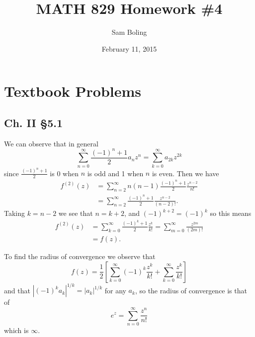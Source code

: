 \documentclass{article}
\title{MATH 829 Homework \#4}
\date{February 11, 2015}
\author{Sam Boling}
\newcounter{Problem}
\begin{document}
\begin{titlepage}
\maketitle
\end{titlepage}

\section{Textbook Problems}

\subsection*{Ch. II \S 5.1}
We can observe that in general
$$
  \sum_{n=0}^\infty \frac{(-1)^n + 1}{2} a_n z^n
= \sum_{k=0}^\infty a_{2k} z^{2k}
$$
since $\frac{(-1)^n + 1}{2}$ is 0 when $n$ is odd and 1 when $n$ is
even. Then we have
\begin{align*}
   f^{(2)}(z)
&= \sum_{n=2}^{\infty} n (n - 1) \frac{(-1)^n + 1}{2} \frac{z^{n-2}}{n!}  \\
&= \sum_{n=2}^{\infty} \frac{(-1)^n + 1}{2} \frac{z^{n-2}}{(n-2)!}.
\end{align*}
Taking $k = n - 2$ we see that $n = k + 2$, and $(-1)^{k + 2} =
(-1)^k$ so this means
\begin{align*}
   f^{(2)}(z)
&= \sum_{k=0}^\infty \frac{(-1)^k + 1}{2} \frac{z^k}{k!}
 = \sum_{m=0}^{\infty} \frac{z^{2m}}{(2m)!} \\
&= f(z).
\end{align*}

To find the radius of convergence we observe that
$$
  f(z)
= \frac{1}{2}\left[
    \sum_{k=0}^\infty (-1)^k \frac{z^k}{k!}
  + \sum_{k=0}^\infty \frac{z^k}{k!}
  \right]
$$
and that $|(-1)^k a_k|^{1 / k} = |a_k|^{1 / k}$ for any $a_k$,
so the radius of convergence is that of
$$
e^z = \sum_{n=0}^\infty \frac{z^n}{n!}
$$
which is $\infty$.
\end{document}
